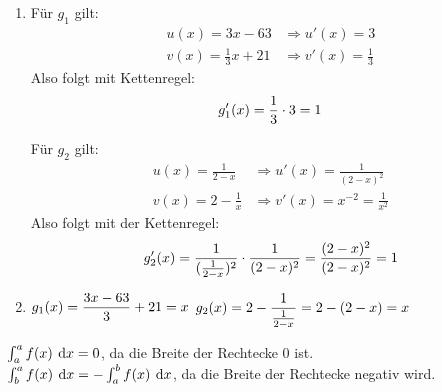 \documentclass[11pt]{exam}
\begin{document}
\begin{questions}
{\begin{solution}
	\begin{enumerate}[label=(\alph*)]
		\item
		\begin{minipage}[t]{0.425\linewidth}
			\vspace{0pt}
			Für $g_1$ gilt:
			\begin{align*}
				u(x)=3x-63 &\Rightarrow u'(x)=3\\
				v(x)=\frac{1}{3}x+21 &\Rightarrow v'(x)=\frac{1}{3}
			\end{align*}
			Also folgt mit Kettenregel: \[g_1'(x)=\frac{1}{3}\cdot3=1\]
		\end{minipage}
		\hfill
		\begin{minipage}[t]{0.55\linewidth}
			\vspace*{0pt}
			Für $g_2$ gilt:
			\begin{align*}
				u(x)=\frac{1}{2-x} &\Rightarrow u'(x)=\frac{1}{(2-x)^2}\\
				v(x)=2-\frac{1}{x} &\Rightarrow v'(x)=x^{-2}=\frac{1}{x^2}
			\end{align*}
			Also folgt mit der Kettenregel: \[g_2'(x)=\frac{1}{(\frac{1}{2-x})^2}\cdot\frac{1}{(2-x)^2}=\frac{(2-x)^2}{(2-x)^2}=1\]
		\end{minipage}
		\item $\displaystyle g_1(x)=\frac{3x-63}{3}+21=x$  $\displaystyle g_2(x)=2-\frac{1}{\frac{1}{2-x}}=2-(2-x)=x$
	\end{enumerate}
\end{solution}}
{}


\newpage
\noaddpoints
\question[\totalpoints]
\addpoints
{}
{\begin{solution}
		$\int_a^a f(x)\:\operatorname{d}\!{x} = 0$, da die Breite der Rechtecke $0$ ist.\\
		$\int_b^a f(x)\:\operatorname{d}\!{x} = -\int_a^b f(x)\:\operatorname{d}\!{x}$, da die Breite der Rechtecke negativ wird.
\end{solution}}
{}
\begin{parts}
	\setcounter{partno}{1}

\end{parts}
\end{questions}
\end{document}
